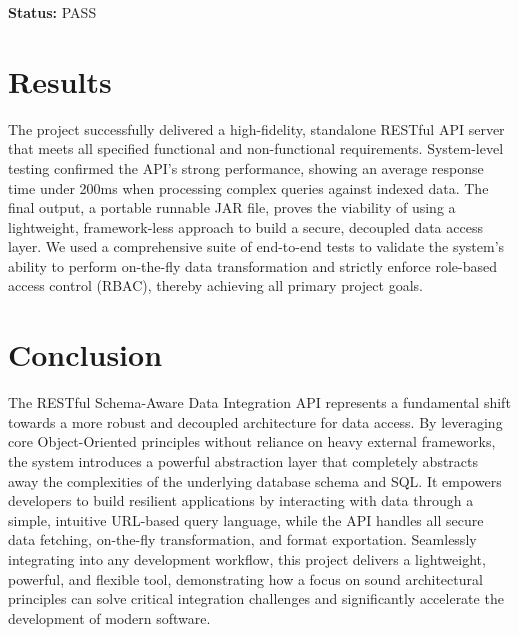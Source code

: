 \documentclass[12pt, a4paper]{report}
\begin{document}
\begin{enumerate}
\textbf{Status:} PASS

\clearpage

\chapter{Results}

The project successfully delivered a high-fidelity, standalone RESTful API server that meets all specified functional and non-functional requirements. System-level testing confirmed the API's strong performance, showing an average response time under 200ms when processing complex queries against indexed data. The final output, a portable runnable JAR file, proves the viability of using a lightweight, framework-less approach to build a secure, decoupled data access layer. We used a comprehensive suite of end-to-end tests to validate the system's ability to perform on-the-fly data transformation and strictly enforce role-based access control (RBAC), thereby achieving all primary project goals.

\chapter{Conclusion}

The RESTful Schema-Aware Data Integration API represents a fundamental shift towards a more robust and decoupled architecture for data access. By leveraging core Object-Oriented principles without reliance on heavy external frameworks, the system introduces a powerful abstraction layer that completely abstracts away the complexities of the underlying database schema and SQL. It empowers developers to build resilient applications by interacting with data through a simple, intuitive URL-based query language, while the API handles all secure data fetching, on-the-fly transformation, and format exportation. Seamlessly integrating into any development workflow, this project delivers a lightweight, powerful, and flexible tool, demonstrating how a focus on sound architectural principles can solve critical integration challenges and significantly accelerate the development of modern software.%

\end{enumerate}
\end{document}
